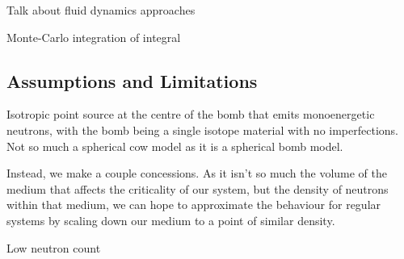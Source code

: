 Talk about fluid dynamics approaches

Monte-Carlo integration of integral

\subsection{Assumptions and Limitations}

Isotropic point source at the centre of the bomb that emits monoenergetic neutrons, with the bomb being a single 
isotope material with no imperfections. Not so much a spherical cow model as it is a spherical bomb model.

Instead, we make a couple 
concessions. As it isn't so much the volume of the medium that affects the criticality of our system, but the density of 
neutrons within that medium, we can hope to approximate the behaviour for regular systems by scaling down our medium to a point 
of similar density. 

Low neutron count
